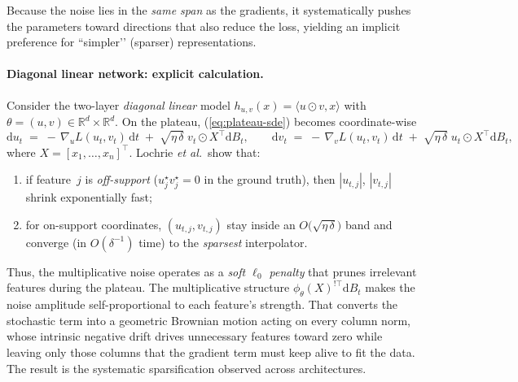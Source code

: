 \documentclass[11pt]{article}
\begin{document}
Because the noise lies in the \emph{same span} as the gradients,
it systematically pushes the parameters toward directions that also reduce the loss,
yielding an implicit preference for “simpler’’ (sparser) representations.  \\[-0.6em]

\paragraph{Diagonal linear network: explicit calculation.}
Consider the two-layer \emph{diagonal linear} model
$h_{u,v}(x)=\langle u\!\odot v,x\rangle$ with
$\theta=(u,v)\in\mathbb R^d\times\mathbb R^d$.  On the plateau,
(\ref{eq:plateau-sde}) becomes coordinate-wise
\begin{equation}
  \mathrm d u_t
  \;=\;
  -\,\nabla_{u}L(u_t,v_t)\,\mathrm dt
  \;+\;
  \sqrt{\eta\,\delta}\;
    v_t\!\odot\!X^{\!\top}\mathrm dB_t,
  \qquad
  \mathrm d v_t
  \;=\;
  -\,\nabla_{v}L(u_t,v_t)\,\mathrm dt
  \;+\;
  \sqrt{\eta\,\delta}\;
    u_t\!\odot\!X^{\!\top}\mathrm dB_t,
  \label{eq:diag-lin-sde}
\end{equation}
where $X=[x_1,\dots,x_n]^{\!\top}$.  
Lochrie \emph{et al.}\ show that:
\begin{enumerate}\setlength\itemsep{0.2em}
  \item if feature~$j$ is \emph{off-support} ($u_j^\star v_j^\star=0$ in the ground truth),
        then $|u_{t,j}|$, $|v_{t,j}|$ shrink exponentially fast;
  \item for on-support coordinates, $(u_{t,j},v_{t,j})$ stay inside an
        $O\!\bigl(\sqrt{\eta\,\delta}\bigr)$ band and converge (in $O(\delta^{-1})$ time)
        to the \emph{sparsest} interpolator.
\end{enumerate}
Thus, the multiplicative noise operates as a \emph{soft $\ell_0$ penalty} that prunes irrelevant
features during the plateau. The multiplicative structure $\phi_\theta(X)^{!\top}\mathrm dB_t$ makes the noise amplitude self-proportional to each feature’s strength. That converts the stochastic term into a geometric Brownian motion acting on every column norm, whose intrinsic negative drift drives unnecessary features toward zero while leaving only those columns that the gradient term must keep alive to fit the data. The result is the systematic sparsification observed across architectures. \\[-0.6em]
\end{document}
